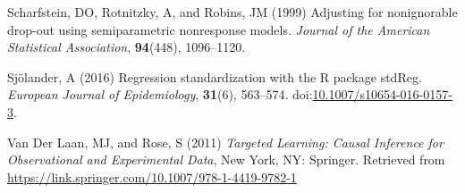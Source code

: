 \documentclass[
  singlecolumn]{article}
\newlength{\cslhangindent}
\newenvironment{CSLReferences}[2] %
 {\begin{list}{}{%
  \setlength{\itemindent}{0pt}
  \setlength{\leftmargin}{0pt}
  \setlength{\parsep}{0pt}
  \ifodd #1
   \setlength{\leftmargin}{\cslhangindent}
   \setlength{\itemindent}{-1\cslhangindent}
  \fi
  \setlength{\itemsep}{#2\baselineskip}}}
 {\end{list}}
\begin{document}
\begin{CSLReferences}{1}{0}
Scharfstein, DO, Rotnitzky, A, and Robins, JM (1999) Adjusting for
nonignorable drop-out using semiparametric nonresponse models.
\emph{Journal of the American Statistical Association},
\textbf{94}(448), 1096--1120.

Sjölander, A (2016) Regression standardization with the R package
stdReg. \emph{European Journal of Epidemiology}, \textbf{31}(6),
563--574.
doi:\href{https://doi.org/10.1007/s10654-016-0157-3}{10.1007/s10654-016-0157-3}.

Van Der Laan, MJ, and Rose, S (2011) \emph{Targeted Learning: Causal
Inference for Observational and Experimental Data}, New York, NY:
Springer. Retrieved from
\url{https://link.springer.com/10.1007/978-1-4419-9782-1}

\end{CSLReferences}
\end{document}
